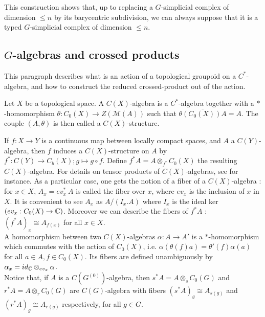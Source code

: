 This construction shows that, up to replacing a $G$-simplicial complex of dimension $\leq n$ by its barycentric subdivision, we can always suppose that it is a typed $G$-simplicial complex of dimension $\leq n$.

\subsection{$G$-algebras and crossed products}

This paragraph describes what is an action of a topological groupoid on a $C^*$-algebra, and how to construct the reduced crossed-product out of the action.

\begin{definition}
Let $X$ be a topological space. A $C(X)$-algebra is a $C^*$-algebra together with a $*$-homomorphism $\theta : C_0(X)\rightarrow Z(\mathcal M(A))$ such that $\overline{\theta (C_0(X)) A} = A$. The couple $(A,\theta)$ is then called a $C(X)$-structure.
\end{definition} 

If $f : X\rightarrow Y$ is a continuous map between locally compact spaces, and $A$ a $C(Y)$-algebra, then $f$ induces a $C(X)$-structure on $A$ by $f^* : C(Y) \rightarrow C_b(X); g\mapsto g\circ f$. Define $f^* A = A \otimes_{f^*} C_0(X)$ the resulting $C(X)$-algebra. For details on tensor products of $C(X)$-algebras, see \cite{LeGall} for instance. As a particular case, one gets the notion of a fiber of a $C(X)$-algebra : for $x\in X$, $A_x = ev_x^* \ A$ is called the fiber over $x$, where $ev_x$ is the inclusion of $x$ in $X$. It is convenient to see $A_x$ as $A/ (I_x .A)$ where $I_x$ is the ideal ker $(ev_x : C_0(X) \rightarrow \mathbb C)$. Moreover we can describe the fibers of $f^*A$ : $(f^*A)_x \cong A_{f(x)}$ for all $x\in X$.\\

A homomorphism between two $C(X)$-algebras $\alpha : A\rightarrow A'$ is a $*$-homomorphism which commutes with the action of $C_0(X)$, i.e. $\alpha(\theta(f)a)=\theta'(f)\alpha(a)$ for all $a\in A,f\in C_0(X)$. Its fibers are defined unambiguously by $\alpha_x = id_\mathbb C \otimes_{ev_x} \alpha$.\\

Notice that, if $A$ is a $C(G^{(0)})$-algebra, then $s^* A = A \otimes_s C_0(G)$ and $r^* A = A \otimes_r C_0(G)$ are $C(G)$-algebra with fibers $(s^*A)_g \cong A_{s(g)}$ and $(r^*A)_g \cong A_{r(g)}$ respectively, for all $g\in G$.


